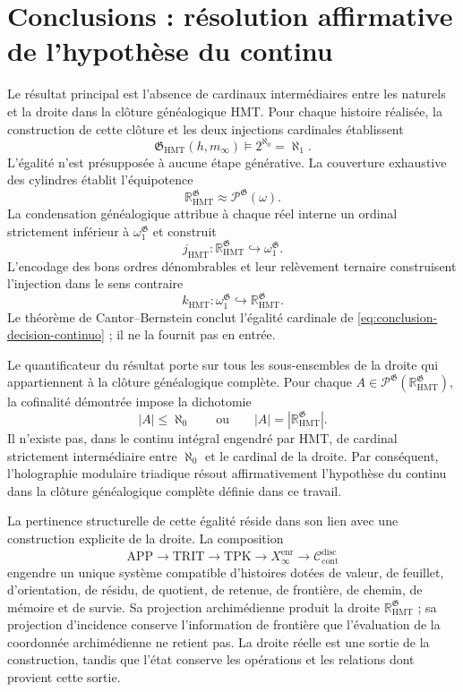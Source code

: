 \section{Conclusions : résolution affirmative de l’hypothèse du continu}
\label{sec:conclusiones-ch}
\begingroup
\fontsize{10.5}{13.4}\selectfont
\setlength{\parskip}{3pt}
\setlength{\abovedisplayskip}{5pt}
\setlength{\belowdisplayskip}{5pt}

Le résultat principal est l’absence de cardinaux intermédiaires entre les
naturels et la droite dans la clôture généalogique HMT. Pour chaque histoire
réalisée, la construction de cette clôture et les deux injections cardinales
établissent
\begin{equation}
 \boxed{
 \mathfrak G_{\mathrm{HMT}}(h,m_\infty)
 \models 2^{\aleph_0}=\aleph_1 .}
 \label{eq:conclusion-decision-continuo}
\end{equation}
L’égalité n’est présupposée à aucune étape générative. La couverture
exhaustive des cylindres établit l’équipotence
\[
 \mathbb R_{\mathrm{HMT}}^{\mathfrak G}
 \approx\mathcal P^{\mathfrak G}(\omega).
\]
La condensation généalogique attribue à chaque réel interne un ordinal strictement inférieur à \(\omega_1^{\mathfrak G}\) et construit
\[
 j_{\mathrm{HMT}}:
 \mathbb R_{\mathrm{HMT}}^{\mathfrak G}\hookrightarrow
 \omega_1^{\mathfrak G}.
\]
L’encodage des bons ordres dénombrables et leur relèvement ternaire
construisent l’injection dans le sens contraire
\[
 k_{\mathrm{HMT}}:
 \omega_1^{\mathfrak G}\hookrightarrow
 \mathbb R_{\mathrm{HMT}}^{\mathfrak G}.
\]
Le théorème de Cantor--Bernstein conclut l'égalité cardinale de \eqref{eq:conclusion-decision-continuo} ; il ne la fournit pas en entrée.

Le quantificateur du résultat porte sur tous les sous-ensembles de la droite qui
appartiennent à la clôture généalogique complète. Pour chaque
\(A\in\mathcal P^{\mathfrak G}
(\mathbb R_{\mathrm{HMT}}^{\mathfrak G})\), la cofinalité démontrée impose
la dichotomie
\[
 |A|\leq\aleph_0
 \qquad\text{ou}\qquad
 |A|=|\mathbb R_{\mathrm{HMT}}^{\mathfrak G}|.
\]
Il n’existe pas, dans le continu intégral engendré par HMT, de cardinal strictement
intermédiaire entre \(\aleph_0\) et le cardinal de la droite. Par conséquent,
l’holographie modulaire triadique résout affirmativement l’hypothèse du
continu dans la clôture généalogique complète définie dans ce travail.

La pertinence structurelle de cette égalité réside dans son lien avec une construction explicite de la droite. La composition
\[
 \mathrm{APP}\longrightarrow\mathrm{TRIT}\longrightarrow\mathrm{TPK}
 \longrightarrow X_\infty^{\mathrm{enr}}
 \longrightarrow\mathcal C_{\mathrm{cont}}^{\mathrm{disc}}
\]
engendre un unique système compatible d'histoires dotées de valeur, de feuillet, d'orientation, de résidu, de quotient, de retenue, de frontière, de chemin, de mémoire et de survie. Sa projection archimédienne produit la droite \(\mathbb R_{\mathrm{HMT}}^{\mathfrak G}\) ; sa projection d'incidence conserve l'information de frontière que l'évaluation de la coordonnée archimédienne ne retient pas. La droite réelle est une sortie de la construction, tandis que l'état conserve les opérations et les relations dont provient cette sortie.

